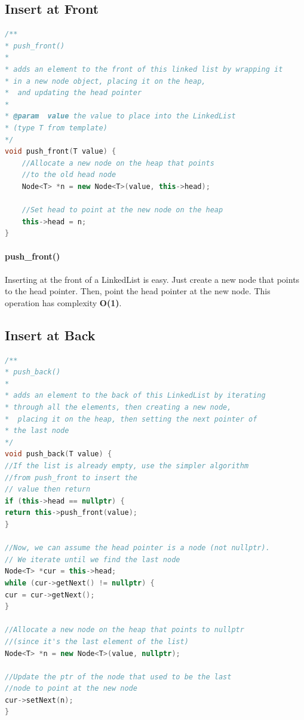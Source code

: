 \documentclass[12pt]{article}
\begin{document}
\subsection{Insert at Front}


\begin{lstlisting}[language = C++]
/**
* push_front()
*
* adds an element to the front of this linked list by wrapping it
* in a new node object, placing it on the heap,
*  and updating the head pointer
*
* @param  value the value to place into the LinkedList
* (type T from template)
*/
void push_front(T value) {
	//Allocate a new node on the heap that points
	//to the old head node
	Node<T> *n = new Node<T>(value, this->head);
	
	//Set head to point at the new node on the heap
	this->head = n;
}
\end{lstlisting}

\paragraph{push\_front()}
Inserting at the front of a LinkedList is easy. Just create a new node that points to the head pointer. Then, point the head pointer at the new node. This operation has complexity \textbf{O(1)}.

\newpage

\subsection{Insert at Back}


\begin{lstlisting}[language = C++]
/**
* push_back()
*
* adds an element to the back of this LinkedList by iterating
* through all the elements, then creating a new node,
*  placing it on the heap, then setting the next pointer of
* the last node
*/
void push_back(T value) {
//If the list is already empty, use the simpler algorithm
//from push_front to insert the
// value then return
if (this->head == nullptr) {
return this->push_front(value);
}

//Now, we can assume the head pointer is a node (not nullptr).
// We iterate until we find the last node
Node<T> *cur = this->head;
while (cur->getNext() != nullptr) {
cur = cur->getNext();
}

//Allocate a new node on the heap that points to nullptr
//(since it's the last element of the list)
Node<T> *n = new Node<T>(value, nullptr);

//Update the ptr of the node that used to be the last
//node to point at the new node
cur->setNext(n);
}

\end{lstlisting}
\end{document}
